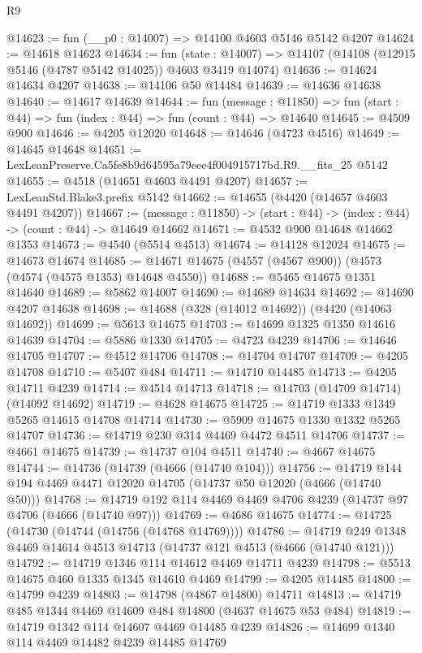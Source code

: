 \begin{lexlean}{R9}
\begin{coremodule}
@14623 := fun (__p0 : @14007) => @14100 @4603 @5146 @5142 @4207
@14624 := @14618 @14623
@14634 := fun (state : @14007) =>
  @14107 (@14108 (@12915 @5146 (@4787 @5142 @14025)) @4603 @3419 @14074)
@14636 := @14624 @14634 @4207
@14638 := @14106 @50 @14484
@14639 := @14636 @14638
@14640 := @14617 @14639
@14644 := fun (message : @11850) =>
  fun (start : @44) => fun (index : @44) => fun (count : @44) => @14640
@14645 := @4509 @900
@14646 := @4205 @12020
@14648 := @14646 (@4723 @4516)
@14649 := @14645 @14648
@14651 := LexLeanPreserve.Ca5fe8b9d64595a79eee4f004915717bd.R9.__fits_25 @5142
@14655 := @4518 (@14651 @4603 @4491 @4207)
@14657 := LexLeanStd.Blake3.prefix @5142
@14662 := @14655 (@4420 (@14657 @4603 @4491 @4207))
@14667 := (message : @11850) -> (start : @44) -> (index : @44) -> (count : @44) -> @14649 @14662
@14671 := @4532 @900 @14648 @14662 @1353
@14673 := @4540 (@5514 @4513)
@14674 := @14128 @12024
@14675 := @14673 @14674
@14685 := @14671 @14675 (@4557 (@4567 @900)) (@4573 (@4574 (@4575 @1353) @14648 @4550))
@14688 := @5465 @14675 @1351 @14640
@14689 := @5862 @14007
@14690 := @14689 @14634
@14692 := @14690 @4207 @14638
@14698 := @14688 (@328 (@14012 @14692)) (@4420 (@14063 @14692))
@14699 := @5613 @14675
@14703 := @14699 @1325 @1350 @14616 @14639
@14704 := @5886 @1330
@14705 := @4723 @4239
@14706 := @14646 @14705
@14707 := @4512 @14706
@14708 := @14704 @14707
@14709 := @4205 @14708
@14710 := @5407 @484
@14711 := @14710 @14485
@14713 := @4205 @14711 @4239
@14714 := @4514 @14713
@14718 := @14703 (@14709 @14714) (@14092 @14692)
@14719 := @4628 @14675
@14725 := @14719 @1333 @1349 @5265 @14615 @14708 @14714
@14730 := @5909 @14675 @1330 @1332 @5265 @14707
@14736 := @14719 @230 @314 @4469 @4472 @4511 @14706
@14737 := @4661 @14675
@14739 := @14737 @104 @4511
@14740 := @4667 @14675
@14744 := @14736 (@14739 (@4666 (@14740 @104)))
@14756 := @14719 @144 @194 @4469 @4471 @12020 @14705 (@14737 @50 @12020 (@4666 (@14740 @50)))
@14768 := @14719 @192 @114 @4469 @4469 @4706 @4239 (@14737 @97 @4706 (@4666 (@14740 @97)))
@14769 := @4686 @14675
@14774 := @14725 (@14730 (@14744 (@14756 (@14768 @14769))))
@14786 := @14719 @249 @1348 @4469 @14614 @4513 @14713 (@14737 @121 @4513 (@4666 (@14740 @121)))
@14792 := @14719 @1346 @114 @14612 @4469 @14711 @4239
@14798 := @5513 @14675 @460 @1335 @1345 @14610 @4469
@14799 := @4205 @14485
@14800 := @14799 @4239
@14803 := @14798 (@4867 @14800) @14711
@14813 := @14719 @485 @1344 @4469 @14609 @484 @14800 (@4637 @14675 @53 @484)
@14819 := @14719 @1342 @114 @14607 @4469 @14485 @4239
@14826 := @14699 @1340 @114 @4469 @14482 @4239 @14485 @14769

\end{coremodule}
\end{lexlean}
